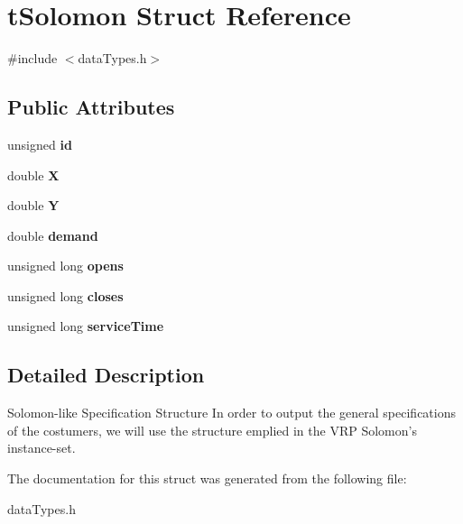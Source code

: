 \hypertarget{structt_solomon}{
\section{tSolomon Struct Reference}
\label{structt_solomon}
}


{\ttfamily \#include $<$dataTypes.h$>$}

\subsection*{Public Attributes}
\begin{DoxyCompactItemize}
\item 
\hypertarget{structt_solomon_a16e2ec2b859c0601309e343ab7c35218}{
unsigned {\bfseries id}}
\label{structt_solomon_a16e2ec2b859c0601309e343ab7c35218}

\item 
\hypertarget{structt_solomon_a13c38033f9749e50745156cbb3c212e0}{
double {\bfseries X}}
\label{structt_solomon_a13c38033f9749e50745156cbb3c212e0}

\item 
\hypertarget{structt_solomon_a12a79429d5d8f167c9a0dccb376eb1a8}{
double {\bfseries Y}}
\label{structt_solomon_a12a79429d5d8f167c9a0dccb376eb1a8}

\item 
\hypertarget{structt_solomon_a65f2f7289aa1dc80aeb9831e3a951b9b}{
double {\bfseries demand}}
\label{structt_solomon_a65f2f7289aa1dc80aeb9831e3a951b9b}

\item 
\hypertarget{structt_solomon_ae632367a22d5834d7c87fa9da6bb4534}{
unsigned long {\bfseries opens}}
\label{structt_solomon_ae632367a22d5834d7c87fa9da6bb4534}

\item 
\hypertarget{structt_solomon_a45e2e4c4c03b237ac30b4e686d5899e2}{
unsigned long {\bfseries closes}}
\label{structt_solomon_a45e2e4c4c03b237ac30b4e686d5899e2}

\item 
\hypertarget{structt_solomon_ab693285ffe9913c597e6ef5e5882581e}{
unsigned long {\bfseries serviceTime}}
\label{structt_solomon_ab693285ffe9913c597e6ef5e5882581e}

\end{DoxyCompactItemize}


\subsection{Detailed Description}
Solomon-\/like Specification Structure In order to output the general specifications of the costumers, we will use the structure emplied in the VRP Solomon's instance-\/set. 

The documentation for this struct was generated from the following file:\begin{DoxyCompactItemize}
\item 
dataTypes.h\end{DoxyCompactItemize}
